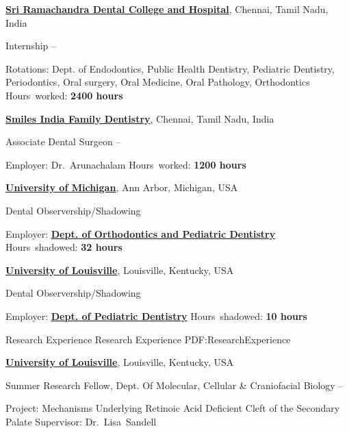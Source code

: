 \documentclass[letterpaper,MMMyyyy,nonstopmode]{simpleresumecv}
\newcommand{\uLouisville}{\href{http://louisville.edu/dentistry}
{\textbf{University of Louisville}},
Louisville, Kentucky, USA}
\begin{document}
\begin{Body}
\BigGap
\Entry
\href{http://www.sriramachandra.edu.in/}
{\textbf{Sri Ramachandra Dental College and Hospital}},
Chennai, Tamil Nadu, India

\Gap
\BulletItem
Internship
\hfill
{} --
\begin{Detail}
\SubBulletItem
Rotations:
Dept. of Endodontics, Public Health Dentistry, Pediatric Dentistry, Periodontics, Oral surgery, Oral Medicine, Oral Pathology, Orthodontics  
\SubBulletItem
Hours~worked: 
\textbf{2400 hours}
\end{Detail}


\BigGap
\Entry
\href{http://www.smilesindia.com/}
{\textbf{Smiles India Family Dentistry}},
Chennai, Tamil Nadu, India

\Gap
\BulletItem
Associate Dental Surgeon
\hfill
{} --
\begin{Detail}
\SubBulletItem
Employer:
Dr.~Arunachalam
\SubBulletItem
Hours~worked: 
\textbf{1200 hours}
\end{Detail}

\BigGap
\Entry
\href{http://www.dent.umich.edu}
{\textbf{University of Michigan}},
Ann Arbor, Michigan, USA

\Gap
\BulletItem
Dental Observership/Shadowing
\hfill
{}
\begin{Detail}
\SubBulletItem
Employer:
\href{http://www.dent.umich.edu/about-school/department/opd/graduate-program-orthodontics}
{\textbf{Dept. of Orthodontics and Pediatric Dentistry}}
\SubBulletItem
Hours~shadowed: 
\textbf{32 hours}
\end{Detail}


\BigGap
\Entry
\href{http://www.dent.umich.edu}
{\textbf{University of Louisville}},
Louisville, Kentucky, USA

\Gap
\BulletItem
Dental Observership/Shadowing
\hfill
{}
\begin{Detail}
\SubBulletItem
Employer:
\href{http://louisville.edu/dentistry}
{\textbf{Dept. of Pediatric Dentistry}}
\SubBulletItem
Hours~shadowed: 
\textbf{10 hours}
\end{Detail}


\Section
{Research Experience}
{Research Experience}
{PDF:ResearchExperience}

\Entry
\uLouisville

\Gap
\BulletItem
Summer Research Fellow, Dept. Of Molecular, Cellular \& Craniofacial Biology
\hfill 
{} --
\begin{Detail}
\SubBulletItem
Project:
Mechanisms Underlying Retinoic Acid Deficient Cleft of the Secondary Palate
\SubBulletItem
Supervisor:
Dr.~Lisa~Sandell
\end{Detail}


\end{Body}
\end{document}

